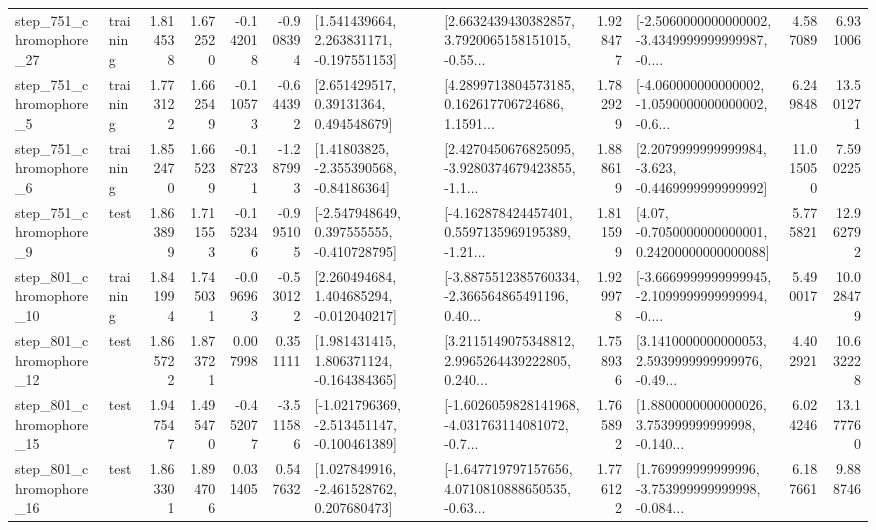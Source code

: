\begin{tabular}{llrrrrllrlrr}
  step\_751\_chromophore\_27 &  training &      1.814538 &    1.672520 &     -0.142018 & -0.908394 &    [1.541439664, 2.263831171, -0.197551153] &  [2.6632439430382857, 3.7920065158151015, -0.55... &       1.928477 &  [-2.5060000000000002, -3.4349999999999987, -0.... &            4.587089 &          6.931006 \\
   step\_751\_chromophore\_5 &  training &      1.773122 &    1.662549 &     -0.110573 & -0.644392 &      [2.651429517, 0.39131364, 0.494548679] &  [4.2899713804573185, 0.162617706724686, 1.1591... &       1.782929 &  [-4.060000000000002, -1.0590000000000002, -0.6... &            6.249848 &         13.501271 \\
   step\_751\_chromophore\_6 &  training &      1.852470 &    1.665239 &     -0.187231 & -1.287993 &     [1.41803825, -2.355390568, -0.84186364] &  [2.4270450676825095, -3.9280374679423855, -1.1... &       1.888619 &  [2.2079999999999984, -3.623, -0.4469999999999992] &           11.015050 &          7.590225 \\
   step\_751\_chromophore\_9 &      test &      1.863899 &    1.711553 &     -0.152346 & -0.995105 &   [-2.547948649, 0.397555555, -0.410728795] &  [-4.162878424457401, 0.5597135969195389, -1.21... &       1.811599 &   [4.07, -0.7050000000000001, 0.24200000000000088] &            5.775821 &         12.962792 \\
  step\_801\_chromophore\_10 &  training &      1.841994 &    1.745031 &     -0.096963 & -0.530122 &    [2.260494684, 1.404685294, -0.012040217] &  [-3.8875512385760334, -2.366564865491196, 0.40... &       1.929978 &  [-3.6669999999999945, -2.1099999999999994, -0.... &            5.490017 &         10.028479 \\
  step\_801\_chromophore\_12 &      test &      1.865722 &    1.873721 &      0.007998 &  0.351111 &    [1.981431415, 1.806371124, -0.164384365] &  [3.2115149075348812, 2.9965264439222805, 0.240... &       1.758936 &  [3.1410000000000053, 2.5939999999999976, -0.49... &            4.402921 &         10.632228 \\
  step\_801\_chromophore\_15 &      test &      1.947547 &    1.495470 &     -0.452077 & -3.511586 &  [-1.021796369, -2.513451147, -0.100461389] &  [-1.6026059828141968, -4.031763114081072, -0.7... &       1.765892 &  [1.8800000000000026, 3.753999999999998, -0.140... &            6.024246 &         13.177760 \\
  step\_801\_chromophore\_16 &      test &      1.863301 &    1.894706 &      0.031405 &  0.547632 &    [1.027849916, -2.461528762, 0.207680473] &  [-1.647719797157656, 4.0710810888650535, -0.63... &       1.776122 &  [1.769999999999996, -3.753999999999998, -0.084... &            6.187661 &          9.888746 \\

\end{tabular}
